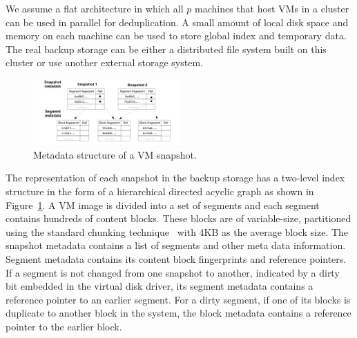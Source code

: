 We assume a flat architecture in which  all $p$ machines that host VMs in a cluster can 
be used in parallel for deduplication. 
A small amount of local disk space and memory on each machine can be used 
to store global index and temporary data. 
The real backup storage can be either a distributed file system built on
this cluster  or use another  external storage system. 



\begin{figure}
\centering
\includegraphics[width=0.5\textwidth]{snapshotdata.pdf}
\caption{ Metadata structure of a VM snapshot.}
\label{fig:snapshot}
\end{figure}

The representation of each snapshot in the backup storage
has a two-level index structure in the form of a hierarchical
directed acyclic graph as shown in Figure~\ref{fig:snapshot}.
A VM image is divided into a set of segments and each  segment contains hundreds of content blocks. 
These blocks are of variable-size, partitioned using
the standard chunking technique~\cite{similar94} with 4KB as the average block size. 
The snapshot metadata  contains a list of segments and other meta data information.
Segment metadata  contains its  content block fingerprints and reference pointers. 
If a segment is not changed from one snapshot to another, indicated by a dirty bit embedded in the virtual disk driver, 
its segment metadata contains a reference pointer to an earlier segment.
For a dirty segment, if one of its blocks is duplicate to another block in the system,  
the block metadata contains a reference pointer to the earlier block.





